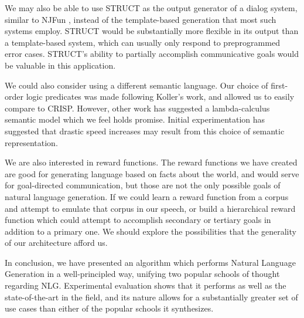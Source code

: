 We may also be able to use STRUCT as the output generator of a dialog system,
similar to NJFun \cite{litman_njfun_2000}, instead of the template-based generation
that most such systems employ.  STRUCT would be substantially more flexible in
its output than a template-based system, which can usually only respond to preprogrammed
error cases.  STRUCT's ability to partially accomplish communicative goals would be
valuable in this application.

We could also consider using a different semantic language.  Our choice of first-order logic
predicates was made following Koller's work, and allowed us to easily compare to CRISP.
However, other work has suggested a lambda-calculus semantic model \cite{wong2007learning}
which we feel holds promise.  Initial experimentation has suggested that drastic speed increases
may result from this choice of semantic representation.

We are also interested in reward functions.  The reward functions we have created
are good for generating language based on facts about the world, and would
serve for goal-directed communication, but those are not the only possible
goals of natural language generation.  If we could learn a reward function from
a corpus and attempt to emulate that corpus in our speech, or build a hierarchical
reward function which could attempt to accomplish secondary or tertiary goals
in addition to a primary one.  We should explore the possibilities that the
generality of our architecture afford us.

In conclusion, we have presented an algorithm which performs Natural Language
Generation in a well-principled way, unifying two popular schools of thought regarding
NLG.  Experimental evaluation shows that it performs as well as the state-of-the-art in
the field, and its nature allows for a substantially greater set of use cases than either
of the popular schools it synthesizes.